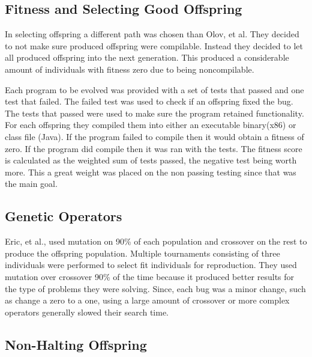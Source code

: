 \documentclass{sig-alternate}
\begin{document}
\subsection{Fitness and Selecting Good Offspring } 
In selecting offspring a different path was chosen than Olov, et al. They decided to not make sure produced offspring were compilable. Instead they decided to let all produced offspring into the next generation. This produced a considerable amount of individuals with fitness zero due to being noncompilable. 

Each program to be evolved was provided with a set of tests that passed and one test that failed. The failed test was used to check if an offspring fixed the bug. The tests that passed were used to make sure the program retained functionality. For each offspring they compiled them into either an executable binary(x86) or class file (Java). If the program failed to compile then it would obtain a fitness of zero. If the program did compile then it was ran with the tests. The fitness score is calculated as the weighted sum of tests passed, the negative test being worth more. This a great weight was placed on the non passing testing since that was the main goal.

  

\subsection{Genetic Operators}
Eric, et al., used mutation on 90\% of each population and crossover on the rest to produce the offspring population. Multiple tournaments consisting of three individuals were performed to select fit individuals for reproduction. They used mutation over crossover 90\% of the time because it produced better results for the type of problems they were solving. Since, each bug was a minor change, such as change a zero to a one, using a large amount of crossover or more complex operators generally slowed their search time.  

\subsection{Non-Halting Offspring}
\end{document}
